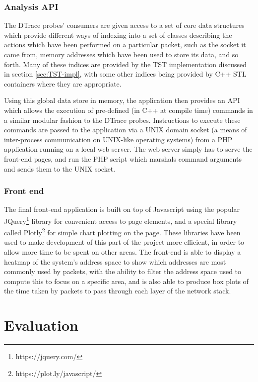 \documentclass[a4paper,12pt,twoside,openright]{report}
\begin{document}
	\subsection{Analysis API}
	
	The DTrace probes' consumers are given access to a set of core data structures which provide different ways of indexing into a set of classes describing the actions which have been performed on a particular packet, such as the socket it came from, memory addresses which have been used to store its data, and so forth. Many of these indices are provided by the TST implementation discussed in section \ref{sec:TST-impl}, with some other indices being provided by C++ STL containers where they are appropriate.
	
	Using this global data store in memory, the application then provides an API which allows the execution of pre-defined (in C++ at compile time) commands in a similar modular fashion to the DTrace probes. Instructions to execute these commands are passed to the application via a UNIX domain socket (a means of inter-process communication on UNIX-like operating systems) from a PHP application running on a local web server. The web server simply has to serve the front-end pages, and run the PHP script which marshals command arguments and sends them to the UNIX socket.
	
	\subsection{Front end}
	
	The final front-end application is built on top of Javascript using the popular JQuery\footnote{https://jquery.com/} library for convenient access to page elements, and a special library called Plotly\footnote{https://plot.ly/javascript/} for simple chart plotting on the page. These libraries have been used to make development of this part of the project more efficient, in order to allow more time to be spent on other areas. The front-end is able to display a heatmap of the system's address space to show which addresses are most commonly used by packets, with the ability to filter the address space used to compute this to focus on a specific area, and is also able to produce box plots of the time taken by packets to pass through each layer of the network stack.
	
	
	\chapter{Evaluation}
	
\end{document}
